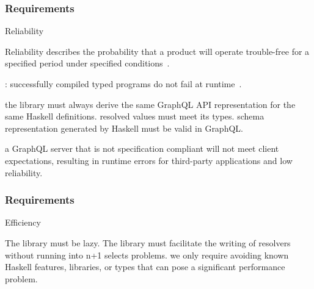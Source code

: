 \begin{frame}\frametitle{Requirements}  

\begin{alertblock}{Reliability}

Reliability describes the probability that a product will operate trouble-free for a specified period under specified conditions~\cite{optimal-release-time}.

\begin{itemize}
    : successfully compiled typed programs do not fail at runtime~\cite{milner-well-typed,wadler-well-typed}.  
    \begin{itemize}
         the library must always derive the same GraphQL API representation for the same Haskell definitions. 
         resolved values must meet its types. 
         schema representation generated by Haskell must be valid in GraphQL.
    \end{itemize}

     a GraphQL server that is not specification compliant will not meet client expectations, resulting in runtime errors for third-party applications and low reliability.

\end{itemize}
\end{alertblock}
\end{frame}

\begin{frame}\frametitle{Requirements}  

\begin{alertblock}{Efficiency} 

The library must be lazy. The library must facilitate the writing of resolvers without running into n+1 selects problems. we only require avoiding known Haskell features, libraries, or types that can pose a significant performance problem.

\end{alertblock}

\end{frame}
